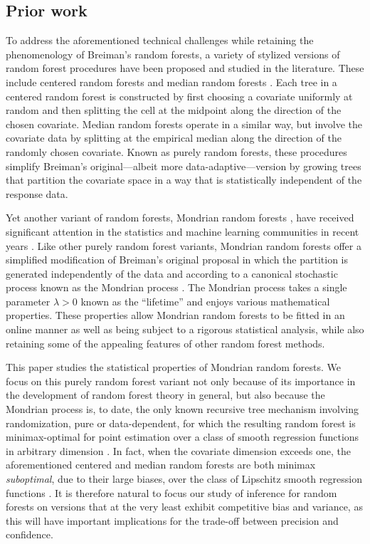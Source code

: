 \subsection{Prior work}

To address the aforementioned technical challenges while retaining the
phenomenology of Breiman's random forests, a variety of stylized versions of
random forest procedures have been proposed and studied in the literature.
These include centered random forests
\citep{biau2012analysis,arnould2023interpolation} and median random forests
\citep{duroux2016impact,arnould2023interpolation}. Each tree in a centered
random forest is constructed by first choosing a covariate uniformly at random
and then splitting the cell at the midpoint along the direction of the chosen
covariate. Median random forests operate in a similar way, but involve the
covariate data by splitting at the empirical median along the direction of the
randomly chosen covariate. Known as purely random forests, these procedures
simplify Breiman's original---albeit more data-adaptive---version by growing
trees that partition the covariate space in a way that is statistically
independent of the response data.

Yet another variant of random forests, Mondrian random forests
\citep{lakshminarayanan2014mondrian}, have received significant attention in
the statistics and machine learning communities in recent years
\citep{ma2020isolation, mourtada2020minimax, scillitoe2021uncertainty,
mourtada2021amf, vicuna2021reducing, gao2022towards, o2022stochastic}. Like
other purely random forest variants, Mondrian random forests offer a simplified
modification of Breiman's original proposal in which the partition is generated
independently of the data and according to a canonical stochastic process known
as the Mondrian process \citep{roy2008mondrian}. The Mondrian process takes a
single parameter $\lambda > 0$ known as the ``lifetime'' and enjoys various
mathematical properties. These properties allow Mondrian random forests to be
fitted in an online manner as well as being subject to a rigorous statistical
analysis, while also retaining some of the appealing features of other random
forest methods.

This paper studies the statistical properties of Mondrian random forests. We
focus on this purely random forest variant not only because of its importance
in the development of random forest theory in general, but also because the
Mondrian process is, to date, the only known recursive tree mechanism involving
randomization, pure or data-dependent, for which the resulting random forest is
minimax-optimal for point estimation over a class of smooth regression
functions in arbitrary dimension \citep{mourtada2020minimax}. In fact, when the
covariate dimension exceeds one, the aforementioned centered and median random
forests are both minimax \emph{suboptimal}, due to their large biases, over the
class of Lipschitz smooth regression functions \citep{klusowski2021sharp}. It
is therefore natural to focus our study of inference for random forests on
versions that at the very least exhibit competitive bias and variance, as this
will have important implications for the trade-off between precision and
confidence.

